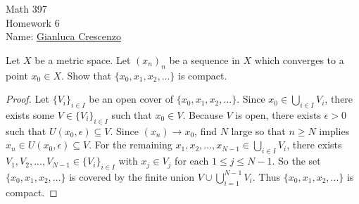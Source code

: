 \documentclass[11pt,twoside,openany]{memoir}
\begin{document}
\begin{center}
{\large Math 397 \\[0.1in]Homework 6 \\[0.1in]}
{Name:} {\underline{Gianluca Crescenzo\hspace*{2in}}}\\[0.15in]
\end{center}
\vspace{4pt}
    \addtocounter{exercise}{2}
    \begin{exercise}
        Let $X$ be a metric space. Let $(x_n)_n$ be a sequence in $X$ which converges to a point $x_0 \in X$. Show that $\{x_0,x_1,x_2,...\}$ is compact.
    \end{exercise}
        \begin{proof}
            Let $\{V_i\}_{i \in I}$ be an open cover of $\{x_0, x_1, x_2, ...\}$. Since $x_0 \in \bigcup_{i \in I} V_i$, there exists some $V \in \{V_i\}_{i \in I}$ such that $x_0 \in V$. Because $V$ is open, there exists $\epsilon > 0$ such that $U(x_0, \epsilon) \subseteq V$. Since $(x_n) \rightarrow x_0$, find $N$ large so that $n \geq N$ implies $x_n \in U(x_0, \epsilon) \subseteq V$. For the remaining $x_1,x_2,...,x_{N-1} \in \bigcup_{i \in I}V_i$, there exists $V_1,V_2,...,V_{N-1} \in \{V_i\}_{i \in I}$ with $x_j \in V_j$ for each $1 \leq j \leq N-1$. So the set $\{x_0,x_1,x_2,...\}$ is covered by the finite union $V \cup \bigcup_{i = 1}^{N-1}V_i$. Thus $\{x_0,x_1,x_2,...\}$ is compact.
        \end{proof}
\end{document}
